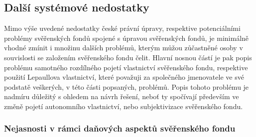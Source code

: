 \documentclass{article}
\begin{document}


\subsection{Další systémové nedostatky}

Mimo výše uvedené nedostatky české právní úpravy, respektive potenciálními problémy svěřenských fondů spojené s úpravou svěřenských fondů, je minimálně vhodné zmínit i množinu dalších problémů, kterým můžou zůčastněné osoby v souvislosti se založením svěřenského fondu čelit. Hlavní nosnou částí je pak popis problému samotného rozdílného pojetí vlastnictví svěřenského fondu, respektive použití Lepaullova vlastnictví, které považuji za společného jmenovatele ve své podstatě veškerých, v této části popsaných, problémů. Popis tohoto problému je nadmíru důležitý s ohledem na návrh řešení, neboť ty spočívají především ve změně pojetí autonomního vlastnictví, nebo subjektivizace svěřenského fondu.\\


\subsubsection{Nejasnosti v rámci daňových aspektů svěřenského fondu}

\end{document}
